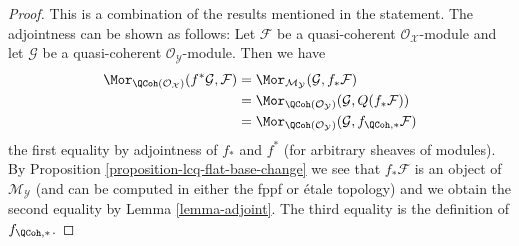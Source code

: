 \begin{proof}
This is a combination of the results mentioned in the statement.
The adjointness can be shown as follows: Let $\mathcal{F}$
be a quasi-coherent $\mathcal{O}_\mathcal{X}$-module and let
$\mathcal{G}$ be a quasi-coherent $\mathcal{O}_\mathcal{Y}$-module.
Then we have
\begin{align*}
\Mor_{\QCoh(\mathcal{O}_\mathcal{X})}(f^*\mathcal{G}, \mathcal{F})
& =
\Mor_{\mathcal{M}_\mathcal{Y}}(\mathcal{G}, f_*\mathcal{F}) \\
& =
\Mor_{\QCoh(\mathcal{O}_\mathcal{Y})}(\mathcal{G}, Q(f_*\mathcal{F}))
\\
& =
\Mor_{\QCoh(\mathcal{O}_\mathcal{Y})}(\mathcal{G},
f_{\QCoh, *}\mathcal{F})
\end{align*}
the first equality by adjointness of $f_*$ and $f^*$ (for arbitrary sheaves
of modules). By
Proposition \ref{proposition-lcq-flat-base-change}
we see that $f_*\mathcal{F}$ is an object of $\mathcal{M}_\mathcal{Y}$
(and can be computed in either the fppf or \'etale topology) and we
obtain the second equality by Lemma \ref{lemma-adjoint}. The third
equality is the definition of $f_{\QCoh, *}$.


\end{proof}
